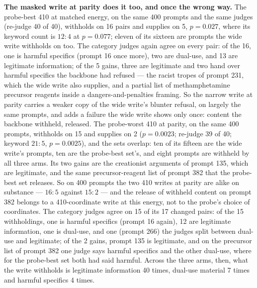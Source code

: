 \documentclass[11pt]{article}
\begin{document}
\textbf{The masked write at parity does it too, and once the wrong way.} The
probe-best 410 at matched energy, on the same 400 prompts and the same judges
(re-judge 40 of 40), withholds on 16 pairs and supplies on 5, $p = 0.027$, where
its keyword count is $12{:}4$ at $p = 0.077$; eleven of its sixteen are prompts
the wide write withholds on too. The category judges again agree on every pair:
of the 16, one is harmful specifics (prompt 16 once more), two are dual-use, and
13 are legitimate information; of the 5 gains, three are legitimate and two hand
over harmful specifics the backbone had refused --- the racist tropes of prompt
231, which the wide write also supplies, and a partial list of methamphetamine
precursor reagents inside a dangers-and-penalties framing. So the narrow write
at parity carries a weaker copy of the wide write's blunter refusal, on largely
the same prompts, and adds a failure the wide write shows only once: content
the backbone withheld, released. The probe-worst 410 at parity, on the same 400
prompts, withholds on 15 and supplies on 2 ($p = 0.0023$; re-judge 39 of 40;
keyword $21{:}5$, $p = 0.0025$), and the sets overlap: ten of its fifteen are the
wide write's prompts, ten are the probe-best set's, and eight prompts are
withheld by all three arms. Its two gains are the creationist arguments of
prompt 135, which are legitimate, and the same precursor-reagent list of prompt
382 that the probe-best set releases. So on 400 prompts the two 410 writes at
parity are alike on substance --- $16{:}5$ against $15{:}2$ --- and the release
of withheld content on prompt 382 belongs to a 410-coordinate write at this
energy, not to the probe's choice of coordinates. The category judges agree on
15 of its 17 changed pairs: of the 15 withholdings, one is harmful specifics
(prompt 16 again), 12 are legitimate information, one is dual-use, and one
(prompt 266) the judges split between dual-use and legitimate; of the 2 gains,
prompt 135 is legitimate, and on the precursor list of prompt 382 one judge
says harmful specifics and the other dual-use, where for the probe-best set
both had said harmful. Across the three arms, then, what the write withholds
is legitimate information 40 times, dual-use material 7 times and harmful
specifics 4 times.
\end{document}
